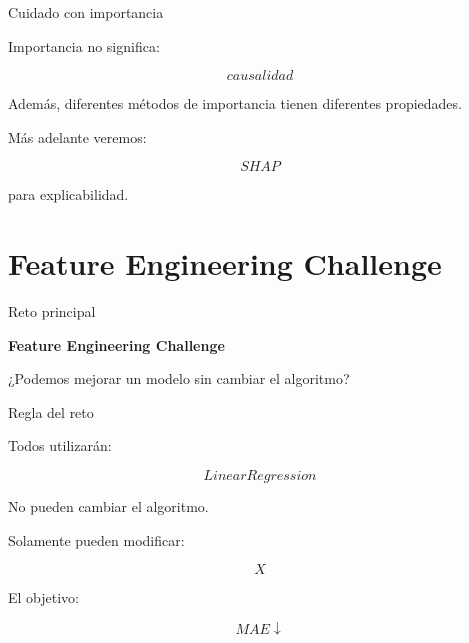 \documentclass[aspectratio=169,11pt]{beamer}
\begin{document}

\begin{frame}{Cuidado con importancia}

Importancia no significa:

\[
\boxed{
causalidad
}
\]

Además, diferentes métodos de importancia tienen diferentes propiedades.

\vspace{0.4cm}

Más adelante veremos:

\[
\boxed{
SHAP
}
\]

para explicabilidad.

\end{frame}

\section{Feature Engineering Challenge}

\begin{frame}{Reto principal}

\begin{center}

{\Huge
\textcolor{azulmarista}{
\textbf{Feature Engineering Challenge}
}
}

\vspace{0.7cm}

{\Large
¿Podemos mejorar un modelo
sin cambiar el algoritmo?
}

\end{center}

\end{frame}


\begin{frame}{Regla del reto}

Todos utilizarán:

\[
\boxed{
LinearRegression
}
\]

No pueden cambiar el algoritmo.

Solamente pueden modificar:

\[
\boxed{
X
}
\]

\vspace{0.4cm}

El objetivo:

\[
MAE\downarrow
\]

\end{frame}
\end{document}
